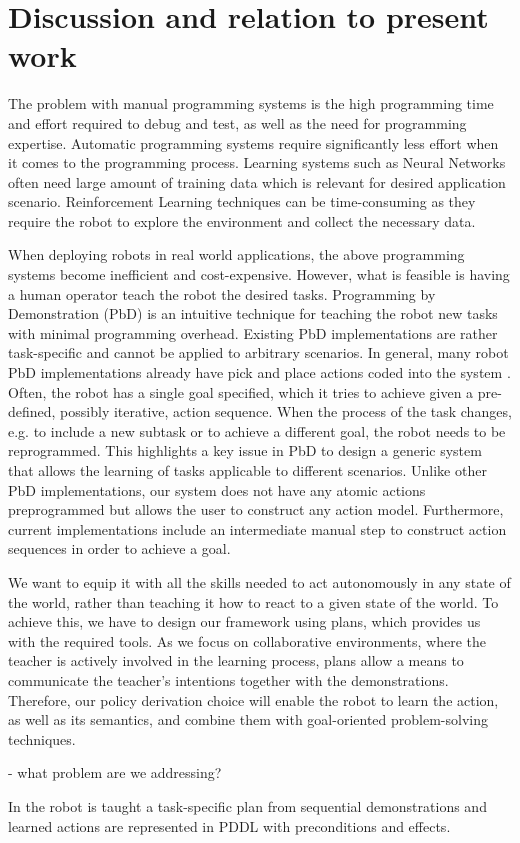 \section{Discussion and relation to present work}
The problem with manual programming systems is the high programming time and effort required to debug and test, as well as the need for programming expertise.
Automatic programming systems require significantly less effort when it comes to the programming process. 
Learning systems such as Neural Networks often need large amount of training data which is relevant for desired application scenario.
Reinforcement Learning techniques can be time-consuming as they require the robot to explore the environment and collect the necessary data.

When deploying robots in real world applications, the above programming systems become inefficient and cost-expensive. 
However, what is feasible is having a human operator teach the robot the desired tasks.
Programming by Demonstration (PbD) is an intuitive technique for teaching the robot new tasks with minimal programming overhead.
Existing PbD implementations are rather task-specific and cannot be applied to arbitrary scenarios.
In general, many robot PbD implementations already have pick and place actions coded into the system \cite{veeraraghavan2008teaching}.
Often, the robot has a single goal specified, which it tries to achieve given a pre-defined, possibly iterative, action sequence.
When the process of the task changes, e.g. to include a new subtask or to achieve a different goal, the robot needs to be reprogrammed.
This highlights a key issue in PbD to design a generic system that allows the learning of tasks applicable to different scenarios.
Unlike other PbD implementations, our system does not have any atomic actions preprogrammed but allows the user to construct any action model.
Furthermore, current implementations include an intermediate manual step to construct action sequences in order to achieve a goal.

We want to equip it with all the skills needed to act autonomously in any state of the world, rather than teaching it how to react to a given state of the world.
To achieve this, we have to design our framework using plans, which provides us with the required tools.
As we focus on collaborative environments, where the teacher is actively involved in the learning process, plans allow a means to communicate the teacher's intentions together with the demonstrations.
Therefore, our policy derivation choice will enable the robot to learn the action, as well as its semantics, and combine them with goal-oriented problem-solving techniques.


- what problem are we addressing? 



In \cite{veeraraghavan2008teaching} the robot is taught a task-specific plan from sequential demonstrations and  learned actions are represented in PDDL with preconditions and effects.